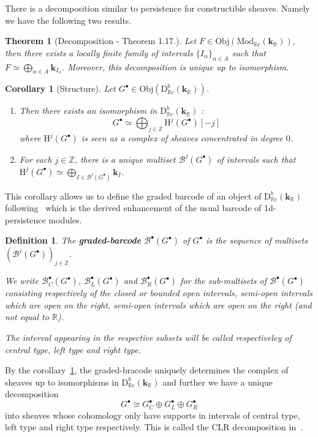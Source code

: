 \documentclass[a4paper, english, 11pt]{article}
\newcommand{\kk}[0]{\textbf{k}}
\newcommand{\Mod}[0]{\text{Mod}}
\newcommand{\0}{\vec{0}}
\newcommand{\R}[0]{\mathbb{R}}
\newcommand{\Z}[0]{\mathbb{Z}}
\newcommand{\B}[0]{\mathcal{B}}
\newcommand{\D}[0]{\text{D}}
\newcommand{\Obj}[0]{\text{Obj}}
\newcommand{\Ho}[0]{\text{H}}
\newtheorem{cor}[prop]{Corollary}
\newtheorem{defi}[prop]{Definition}
\newtheorem{thm}[prop]{Theorem}
\begin{document}
There is a decomposition similar to persistence for constructible sheaves. Namely we have the following two results.
\begin{thm}[Decomposition - \cite{KS18} Theorem 1.17.]\label{T:KSdecomposition}
Let $F \in \Obj(\Mod_{\R c}(\kk_\R))$, then there exists a locally finite family of intervals $\{I_\alpha\}_{\alpha \in A}$ such that $F \simeq \bigoplus_{\alpha \in A} \kk_{I_\alpha}$. Moreover, this decomposition is unique up to isomorphism.
\end{thm}
\begin{cor}[Structure]\label{T:KSstructure}
Let $G^\bullet\in \Obj(\D^b_{\R c}(\kk_\R))$. 
\begin{enumerate} \item Then there exists an isomorphism in $\D^b_{\R c}(\kk_\R)$ : $$G^\bullet \simeq \bigoplus_{j\in\Z} \Ho^j(G^\bullet)[-j]$$
where $\Ho^j(G^\bullet)$ is seen as a complex of sheaves concentrated in degree $0$.
\item For each $j\in \Z$, there is a unique multiset $\B^j(G^\bullet) $ of intervals such that  $\Ho^j(G^\bullet)\simeq \bigoplus_{I \in \B^j(G^\bullet)} \kk_{I}$. 
\end{enumerate}\end{cor}
This corollary allows us to define the graded barcode of an object of $\D^b_{\R c}(\kk_\R)$ following~\cite{Berk18} which is the  derived enhancement of the usual barcode of 1d-persistence modules.
\begin{defi}\label{D:gradedbarcode}
 The \textbf{graded-barcode} $\B^\bullet(G^\bullet)$ of $G^\bullet$ is the sequence of multisets $(\B^j(G^\bullet))_{j\in \Z}$.
 
We write $\B_C^\bullet(G^\bullet)$, $\B_L^\bullet(G^\bullet)$ and $\B_R^\bullet(G^\bullet)$ for the  sub-multisets of $\B^\bullet(G^\bullet)$ consisting respectively of the closed or bounded open intervals, semi-open intervals which are open on the right,  semi-open intervals which are open on the right (and not equal to $\R$). 

The interval appearing in the respective subsets will be called respectiveley of central type, left type and right type.
 \end{defi}
By the corollary~\ref{T:KSstructure}, the graded-bracode uniquely determines the complex of sheaves up to isomorphisms in $\D^b_{\R c}(\kk_\R)$ and further we have a unique decomposition $$G^\bullet \cong G_C^\bullet \oplus G_L^\bullet \oplus G_R^\bullet $$ into sheaves whose cohomology only have supports    
in intervals of central type, left type and right type respectively. This is called the CLR decomposition in~\cite{Berk18}.
\end{document}
